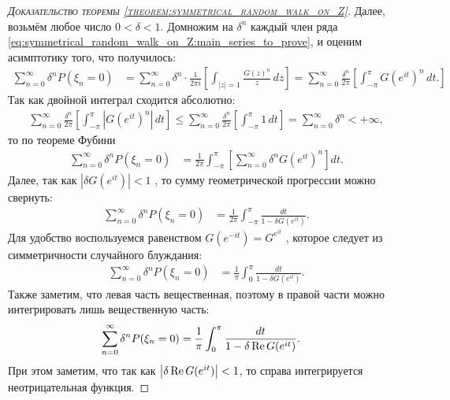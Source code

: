 \documentclass[../main.tex]{subfiles}
\begin{document}
\begin{proof}[\normalfont\textsc{Доказательство теоремы \ref{theorem:symmetrical_random_walk_on_Z}}]
 Далее, возьмём любое число $ 0 < \delta < 1 $. Домножим на $ \delta^{n} $ каждый член ряда \eqref{eq:symmetrical_random_walk_on_Z:main_series_to_prove}, и оценим асимптотику того, что получилось:
 \begin{align*}
  \sum_{n=0}^{\infty} \delta^{n}P(\xi_n = 0) &= \sum_{n=0}^{\infty} \delta^{n} \cdot \frac{1}{2\pi i} \left[\int_{\left| z \right|=1} \frac{G(z)^{n}}{z}\,dz \right] = \sum_{n=0}^{\infty}\frac{\delta^{n}}{2\pi} \left[ \int_{-\pi}^{\pi} G(e^{it})^{n}\,dt. \right]
 \end{align*} Так как двойной интеграл сходится абсолютно:
 \begin{align*}
  \sum_{n=0}^{\infty} \frac{\delta^{n}}{2\pi} \left[ \int_{-\pi}^{\pi} \left| G(e^{it})^{n} \right|\,dt \right] \leqslant \sum_{n=0}^{\infty} \frac{\delta^{n}}{2\pi} \left[ \int_{-\pi}^{\pi} 1\,dt \right] = \sum_{n=0}^{\infty}\delta^{n} < +\infty,
 \end{align*} то по теореме Фубини
 \begin{align*}
  \sum_{n=0}^{\infty}\delta^{n}P(\xi_n=0) &= \frac{1}{2\pi} \int_{-\pi}^{\pi} \left[\sum_{n=0}^{\infty} \delta^{n}G(e^{it})^{n} \right]dt.
 \end{align*} Далее, так как $ \left| \delta G(e^{it}) \right| < 1 $ , то сумму геометрической прогрессии можно свернуть:
 \begin{align*}
  \sum_{n=0}^{\infty}\delta^{n}P(\xi_n=0) &= \frac{1}{2\pi} \int_{-\pi}^{\pi} \frac{dt}{1 - \delta G(e^{it})}.
 \end{align*} Для удобство воспользуемся равенством $ G(e^{-it}) = G^{e^{it}} $ , которое следует из симметричности случайного блуждания:
 \begin{align*}
  \sum_{n=0}^{\infty}\delta^{n}P(\xi_n=0) &= \frac{1}{\pi} \int_{0}^{\pi} \frac{dt}{1 - \delta G(e^{it})}.
 \end{align*} Также заметим, что левая часть вещественная, поэтому в правой части можно интегрировать лишь вещественную часть:
 \begin{align*}
  \sum_{n=0}^{\infty}\delta^{n}P(\xi_n=0) &= \frac{1}{\pi} \int_{0}^{\pi} \frac{dt}{1 - \delta \operatorname{Re} G(e^{it})}.
 \end{align*} При этом заметим, что так как $ \left| \delta \operatorname{Re} G(e^{it}) \right| < 1 $, то справа интегрируется неотрицательная функция.


\end{proof}
\end{document}
